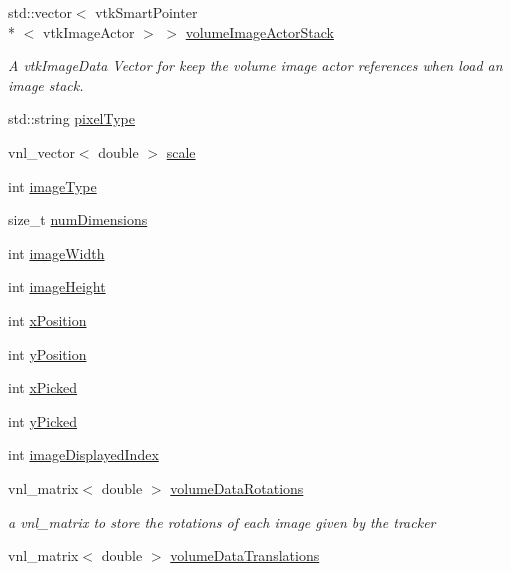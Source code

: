 \begin{DoxyCompactItemize}
std\-::vector$<$ vtk\-Smart\-Pointer\\*
$<$ vtk\-Image\-Actor $>$ $>$ \hyperlink{class_q_v_t_k_image_widget_a0cdd7ea88a31d89a60352c27dc8bd556}{volume\-Image\-Actor\-Stack}
\begin{DoxyCompactList}\small\item\em A vtk\-Image\-Data Vector for keep the volume image actor references when load an image stack. \end{DoxyCompactList}\item 
std\-::string \hyperlink{class_q_v_t_k_image_widget_a067b78e68ed458d840ad1cf0d16b4ad6}{pixel\-Type}
\item 
vnl\-\_\-vector$<$ double $>$ \hyperlink{class_q_v_t_k_image_widget_a9c5324e5b044bf1e55f3205002d69da0}{scale}
\item 
int \hyperlink{class_q_v_t_k_image_widget_a132867322988e692c324f5cc66697341}{image\-Type}
\item 
size\-\_\-t \hyperlink{class_q_v_t_k_image_widget_a6aff403421ea538248d48116a942271b}{num\-Dimensions}
\item 
int \hyperlink{class_q_v_t_k_image_widget_a1ab611f7637a7885347b07ba9aa42e22}{image\-Width}
\item 
int \hyperlink{class_q_v_t_k_image_widget_acc1b249b96b147b447366361331ef60a}{image\-Height}
\item 
int \hyperlink{class_q_v_t_k_image_widget_afd88ea5dbed175232b0c15cbe4cdca89}{x\-Position}
\item 
int \hyperlink{class_q_v_t_k_image_widget_a6724caff3a614db8321deaa70532255c}{y\-Position}
\item 
int \hyperlink{class_q_v_t_k_image_widget_a17897def9ef084b36378099c51f94be3}{x\-Picked}
\item 
int \hyperlink{class_q_v_t_k_image_widget_a484346a1e5c956917e7e35a22aee125a}{y\-Picked}
\item 
int \hyperlink{class_q_v_t_k_image_widget_af88ceea1f8553e4773e50b0362ffec3a}{image\-Displayed\-Index}
\item 
vnl\-\_\-matrix$<$ double $>$ \hyperlink{class_q_v_t_k_image_widget_ab9aba72f9fc8e922555b96f30bd1dba3}{volume\-Data\-Rotations}
\begin{DoxyCompactList}\small\item\em a vnl\-\_\-matrix to store the rotations of each image given by the tracker \end{DoxyCompactList}\item 
vnl\-\_\-matrix$<$ double $>$ \hyperlink{class_q_v_t_k_image_widget_a039e71a63cbbba8d95894df141fa6986}{volume\-Data\-Translations}

\end{DoxyCompactItemize}
